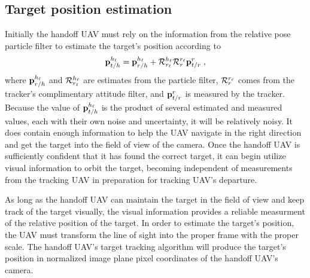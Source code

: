 \subsection{Target position estimation}
Initially the handoff UAV must rely on the information from the relative pose particle filter to estimate the target's position according to
\begin{equation} \label{eq:target_pos_rel}
    {\mathbf{p}}_{t/h}^{h_\ell} = {\mathbf{p}}_{r/h}^{h_\ell} + {\mathcal{R}}_{{r_\ell}}^{{h_\ell}}{\mathcal{R}}_{{r}}^{{r_\ell}}{\mathbf{p}}_{t/r}^{r}\;,
\end{equation}
where ${\mathbf{p}}_{r/h}^{h_\ell}$ and ${\mathcal{R}}_{{r_\ell}}^{{h_\ell}}$ are estimates from the particle filter, ${\mathcal{R}}_{{r}}^{{r_\ell}}$ comes from the tracker's complimentary attitude filter, and ${\mathbf{p}}_{t/r}^{r}$ is measured by the tracker. Because the value of ${\mathbf{p}}_{t/h}^{h_\ell}$ is the product of several estimated and measured values, each with their own noise and uncertainty, it will be relatively noisy. It does contain enough information to help the UAV navigate in the right direction and get the target into the field of view of the camera.
Once the handoff UAV is sufficiently confident that it has found the correct target, it can begin utilize visual information to orbit the target, becoming independent of measurements from the tracking UAV in preparation for tracking UAV's departure.

As long as the handoff UAV can maintain the target in the field of view and keep track of the target visually, the visual information provides a reliable measurment of the relative position of the target.
In order to estimate the target's position, the UAV must transform the line of sight into the proper frame with the proper scale. The handoff UAV's target tracking algorithm will produce the target's position in normalized image plane pixel coordinates of the handoff UAV's camera.

